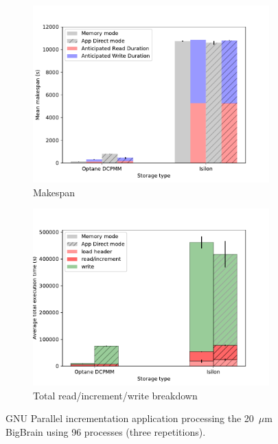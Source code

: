 \begin{figure}
    \begin{subfigure}{0.5\textwidth}
        \centering
    \includegraphics[width=\columnwidth]{figures/optane/makespan-real-20bb_96cpus.pdf}
    \caption{Makespan}\label{fig:optane:20mksp96}
\end{subfigure}
\begin{subfigure}{0.5\textwidth}
        \centering
    \includegraphics[width=\columnwidth]{figures/optane/stacked-real-20bb_96cpus.pdf}
    \caption{Total read/increment/write breakdown}\label{fig:optane:20total96}
\end{subfigure}
\caption{GNU Parallel incrementation application processing the 20~$\mu$m
BigBrain using 96 processes (three repetitions).}\label{fig:optane:2096}
\captionsetup{belowskip=-10pt}
\end{figure}


